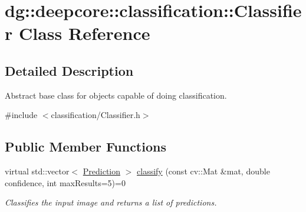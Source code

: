 \hypertarget{classdg_1_1deepcore_1_1classification_1_1_classifier}{}\section{dg\+:\+:deepcore\+:\+:classification\+:\+:Classifier Class Reference}
\label{classdg_1_1deepcore_1_1classification_1_1_classifier}


\subsection{Detailed Description}
Abstract base class for objects capable of doing classification. 

{\ttfamily \#include $<$classification/\+Classifier.\+h$>$}

\subsection*{Public Member Functions}
\begin{DoxyCompactItemize}
\item 
virtual std\+::vector$<$ \hyperlink{structdg_1_1deepcore_1_1classification_1_1_prediction}{Prediction} $>$ \hyperlink{group___classification_module_ga4485a5f0dd8fc0b63fb56284ce5a5705}{classify} (const cv\+::\+Mat \&mat, double confidence, int max\+Results=5)=0
\begin{DoxyCompactList}\small\item\em Classifies the input image and returns a list of predictions. \end{DoxyCompactList}\end{DoxyCompactItemize}
